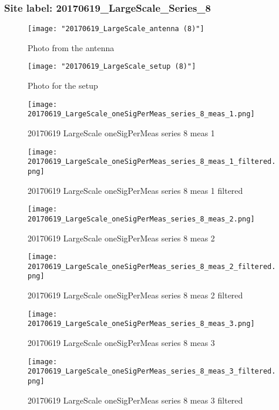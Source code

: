 \subsubsection{Site label: 20170619\_LargeScale\_Series\_8}
\begin{figure}[ht] \caption{Photo from the antenna}
\texttt{[image: "20170619\_LargeScale\_antenna (8)"]}\centering\end{figure}
\begin{figure}[ht] \caption{Photo for the setup}
\texttt{[image: "20170619\_LargeScale\_setup (8)"]}\centering\end{figure}
\begin{figure}[ht] \caption{20170619 LargeScale oneSigPerMeas series 8 meas 1}
\texttt{[image: 20170619\_LargeScale\_oneSigPerMeas\_series\_8\_meas\_1.png]}\centering\end{figure}
\begin{figure}[ht] \caption{20170619 LargeScale oneSigPerMeas series 8 meas 1 filtered}
\texttt{[image: 20170619\_LargeScale\_oneSigPerMeas\_series\_8\_meas\_1\_filtered.png]}\centering\end{figure}
\begin{figure}[ht] \caption{20170619 LargeScale oneSigPerMeas series 8 meas 2}
\texttt{[image: 20170619\_LargeScale\_oneSigPerMeas\_series\_8\_meas\_2.png]}\centering\end{figure}
\begin{figure}[ht] \caption{20170619 LargeScale oneSigPerMeas series 8 meas 2 filtered}
\texttt{[image: 20170619\_LargeScale\_oneSigPerMeas\_series\_8\_meas\_2\_filtered.png]}\centering\end{figure}
\begin{figure}[ht] \caption{20170619 LargeScale oneSigPerMeas series 8 meas 3}
\texttt{[image: 20170619\_LargeScale\_oneSigPerMeas\_series\_8\_meas\_3.png]}\centering\end{figure}
\begin{figure}[ht] \caption{20170619 LargeScale oneSigPerMeas series 8 meas 3 filtered}
\texttt{[image: 20170619\_LargeScale\_oneSigPerMeas\_series\_8\_meas\_3\_filtered.png]}\centering\end{figure}
\clearpage
